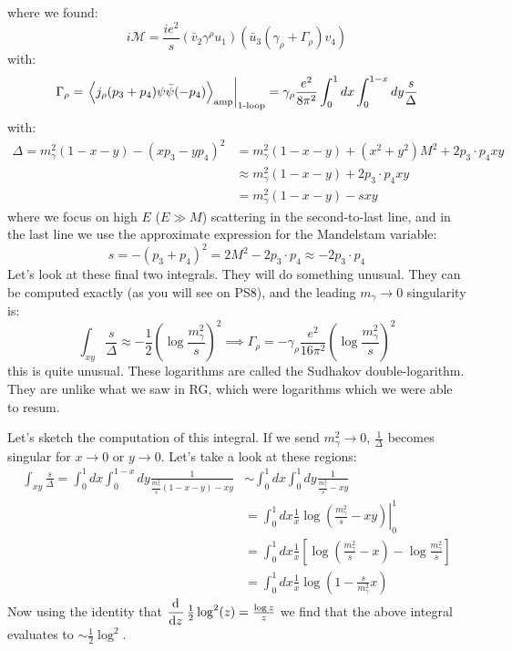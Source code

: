 where we found:
\begin{equation}
    i\mathcal{M} = \frac{ie^2}{s}(\bar{v}_2\gamma^\rho u_1)(\bar{u}_3(\gamma_\rho + \Gamma_\rho)v_4)
\end{equation}
with:
\begin{equation}
    \Gamma_\rho = \left.\left< j_\rho(p_3 + p_4)\psi\bar{\psi}(-p_4) \right>_{\text{amp}}\right|_{\text{1-loop}} = \gamma_\rho \frac{e^2}{8\pi^2}\int_0^1 dx\int_0^{1-x}dy \frac{s}{\Delta}
\end{equation}
with:
\begin{equation}
    \begin{split}
        \Delta = m_\gamma^2(1 - x - y) - (xp_3 - yp_4)^2 &= m_\gamma^2(1-x-y) + (x^2 + y^2)M^2 + 2p_3 \cdot p_4xy
        \\ &\approx m_\gamma^2(1-x-y) + 2p_3 \cdot p_4xy
        \\ &= m_\gamma^2(1 - x - y) - sxy
    \end{split}
\end{equation}
where we focus on high $E$ ($E \gg M$) scattering in the second-to-last line, and in the last line we use the approximate expression for the Mandelstam variable:
\begin{equation}
    s = -(p_3 + p_4)^2 = 2M^2 - 2p_3 \cdot p_4 \approx -2p_3 \cdot p_4
\end{equation}
Let's look at these final two integrals. They will do something unusual. They can be computed exactly (as you will see on PS8), and the leading $m_\gamma \to 0$ singularity is:
\begin{equation}
    \int_{xy}\frac{s}{\Delta} \approx -\frac{1}{2}(\log \frac{m_\gamma^2}{s})^2 \implies \Gamma_\rho = -\gamma_\rho\frac{e^2}{16\pi^2}(\log\frac{m_\gamma^2}{s})^2
\end{equation}
this is quite unusual. These logarithms are called the Sudhakov double-logarithm. They are unlike what we saw in RG, which were logarithms which we were able to resum.

Let's sketch the computation of this integral. If we send $m_\gamma^2 \to 0$, $\frac{1}{\Delta}$ becomes singular for $x \to 0$ or $y \to 0$. Let's take a look at these regions:
\begin{equation}
    \begin{split}
        \int_{xy}\frac{s}{\Delta} = \int_0^1 dx \int_0^{1-x}dy \frac{1}{\frac{m_\gamma^2}{s}(1-x-y) - xy} &\sim \int_0^1 dx \int_0^1 dy \frac{1}{\frac{m_\gamma^2}{s} - xy} 
        \\ &= \int_0^1dx \frac{1}{x}\left.\log(\frac{m_\gamma^2}{s} - xy)\right|_0^1
        \\ &= \int_0^1 dx \frac{1}{x}\left[\log(\frac{m_\gamma^2}{s} - x) - \log\frac{m_\gamma^2}{s}\right] 
        \\ &= \int_0^1 dx \frac{1}{x}\log(1 - \frac{s}{m_\gamma^2}x)
    \end{split}
\end{equation}
Now using the identity that $\dod{}{z}\frac{1}{2}\log^2(z) = \frac{\log z}{z}$ we find that the above integral evaluates to $\sim \frac{1}{2}\log^2$.

